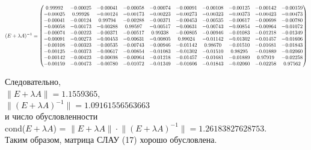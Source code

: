 \documentclass[a4paper, 12pt]{extarticle}
\begin{document}
\begin{equation}
    \scalemath{0.8}{
        (E + \lambda A)^{-1} = \begin{pmatrix}
            0.99992 & -0.00025 & -0.00041 & -0.00058 & -0.00074 & -0.00091 & -0.00108 & -0.00125 & -0.00142 & -0.00159 \\ 
            -0.00025 & 0.99926 & -0.00124 & -0.00173 & -0.00223 & -0.00273 & -0.00323 & -0.00373 & -0.00423 & -0.00473 \\ 
            -0.00041 & -0.00124 & 0.99794 & -0.00288 & -0.00371 & -0.00453 & -0.00535 & -0.00617 & -0.00698 & -0.00780 \\ 
            -0.00058 & -0.00173 & -0.00288 & 0.99597 & -0.00517 & -0.00631 & -0.00743 & -0.00854 & -0.00964 & -0.01072 \\ 
            -0.00074 & -0.00223 & -0.00371 & -0.00517 & 0.99338 & -0.00805 & -0.00946 & -0.01083 & -0.01218 & -0.01349 \\ 
            -0.00091 & -0.00273 & -0.00453 & -0.00631 & -0.00805 & 0.99024 & -0.01142 & -0.01302 & -0.01457 & -0.01606 \\ 
            -0.00108 & -0.00323 & -0.00535 & -0.00743 & -0.00946 & -0.01142 & 0.98670 & -0.01510 & -0.01681 & -0.01843 \\ 
            -0.00125 & -0.00373 & -0.00617 & -0.00854 & -0.01083 & -0.01302 & -0.01510 & 0.98295 & -0.01889 & -0.02060 \\ 
            -0.00142 & -0.00423 & -0.00698 & -0.00964 & -0.01218 & -0.01457 & -0.01681 & -0.01889 & 0.97919 & -0.02258 \\ 
            -0.00159 & -0.00473 & -0.00780 & -0.01072 & -0.01349 & -0.01606 & -0.01843 & -0.02060 & -0.02258 & 0.97562 
        \end{pmatrix}
    }
\end{equation}

\begin{spacing}{1.5}
Следовательно, \\
$\lVert E + \lambda A \rVert = 1.1559365$, \\
$\lVert (E + \lambda A)^{-1} \rVert = 1.09161556563663$ \\
и число обусловленности \\
cond($E + \lambda A$) = $\lVert E + \lambda A \rVert \cdot \lVert (E + \lambda A)^{-1} \rVert = 1.26183827628753$. \\
Таким образом, матрица СЛАУ (17) хорошо обусловлена.\\
\end{spacing}
\end{document}
